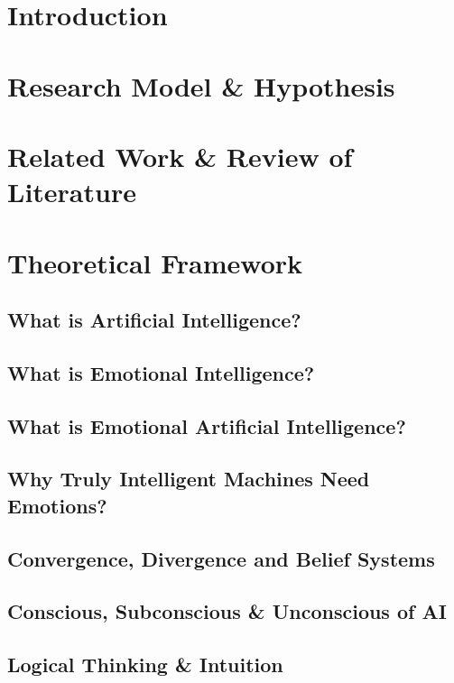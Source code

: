 \documentclass[12pt, a4paper]{article}
\begin{document}
	\begin{multicols}{2}
		\section{Introduction}
		
		\section{Research Model \& Hypothesis}
		
		\section{Related Work \& Review of Literature}
		
		\section{Theoretical Framework}
		\subsection{What is Artificial Intelligence?}
		
		\subsection{What is Emotional Intelligence?}
		
		\subsection{What is Emotional Artificial Intelligence?}
		
		\subsection{Why Truly Intelligent Machines Need Emotions?}
		
		\subsection{Convergence, Divergence and Belief Systems}
		
		\subsection{Conscious, Subconscious \& Unconscious of AI}
		
		\subsection{Logical Thinking \& Intuition}
		

\end{multicols}
\end{document}
